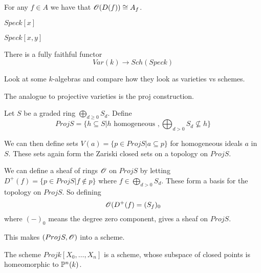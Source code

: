 \begin{proposition}
For any $f\in A$ we have that $\O(D(f))\cong A_f$. 
\end{proposition}

\begin{example}[]
$Spec k[x]$
\end{example}

\begin{example}[]
$Spec k[x,y]$
\end{example}

\begin{proposition}
There is a fully faithful functor
\begin{equation*}
    Var(k)\longrightarrow Sch(Spec k)
\end{equation*}
\end{proposition}

\begin{problem}
Look at some $k$-algebras and compare how they look as varieties vs schemes. 
\end{problem}

The analogue to projective varieties is the proj construction. 

Let $S$ be a graded ring $\bigoplus_{d\geq 0}S_d$. Define 
\begin{equation*}
    Proj S = \{ h\subseteq S | h \text{ homogeneous }, \bigoplus_{d>0}S_d \nsubseteq h \}
\end{equation*}

We can then define sets $V(a) = \{ p\in Proj S|a\subseteq p \}$ for homogeneous ideals $a$ in $S$. These sets again form the Zariski closed sets on a topology on $Proj S$. 

We can define a sheaf of rings $\O$ on $Proj S$ by letting $D^+(f) = \{p\in Proj S | f\notin p\}$ where $f\in \bigoplus_{d>0}S_d$. These form a basis for the topology on $Proj S$. So defining
\begin{equation*}
    \O(D^+(f) = (S_f)_0
\end{equation*}
where $(-)_0$ means the degree zero component, gives a sheaf on $Proj S$. 

This makes $(Proj S, \O)$ into a scheme. 

The scheme $Proj k[X_0, \ldots, X_n]$ is a scheme, whose subspace of closed points is homeomorphic to $\P^n(k)$. 

